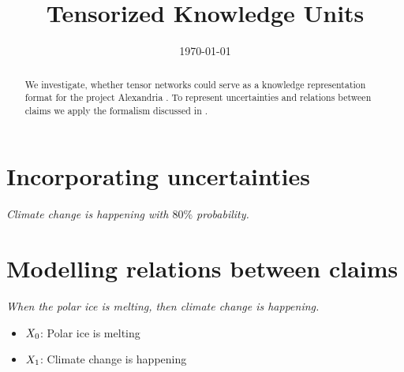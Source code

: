 \documentclass[aps,onecolumn,nofootinbib,pra]{article}
\begin{document}
    \title{Tensorized Knowledge Units}

    \maketitle
    \date{\today}

    \begin{abstract}
        We investigate, whether tensor networks could serve as a knowledge representation format for the project Alexandria \cite{schuhmann_project_2025}.
        To represent uncertainties and relations between claims we apply the formalism discussed in \cite{goessmann_tensor_2026}.
    \end{abstract}


    \section{Incorporating uncertainties}

    \begin{center}
        \textit{
            Climate change is happening with $80\%$ probability.
        }
    \end{center}


    \section{Modelling relations between claims}

    \begin{center}
        \textit{
            When the polar ice is melting, then climate change is happening.
        }
    \end{center}

    \begin{itemize}
        \item $X_{0}$: Polar ice is melting
        \item $X_{1}$: Climate change is happening
    \end{itemize}



\end{document}
